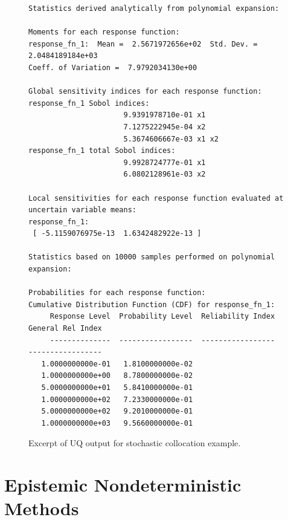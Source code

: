 \begin{figure}
\centering
\begin{bigbox}
\begin{small}
\begin{verbatim}
Statistics derived analytically from polynomial expansion:

Moments for each response function:
response_fn_1:  Mean =  2.5671972656e+02  Std. Dev. = 2.0484189184e+03  
Coeff. of Variation =  7.9792034130e+00

Global sensitivity indices for each response function:
response_fn_1 Sobol indices:
                      9.9391978710e-01 x1
                      7.1275222945e-04 x2
                      5.3674606667e-03 x1 x2
response_fn_1 total Sobol indices:
                      9.9928724777e-01 x1
                      6.0802128961e-03 x2

Local sensitivities for each response function evaluated at 
uncertain variable means:
response_fn_1:
 [ -5.1159076975e-13  1.6342482922e-13 ]

Statistics based on 10000 samples performed on polynomial expansion:

Probabilities for each response function:
Cumulative Distribution Function (CDF) for response_fn_1:
     Response Level  Probability Level  Reliability Index  General Rel Index
     --------------  -----------------  -----------------  -----------------
   1.0000000000e-01   1.8100000000e-02
   1.0000000000e+00   8.7800000000e-02
   5.0000000000e+01   5.8410000000e-01
   1.0000000000e+02   7.2330000000e-01
   5.0000000000e+02   9.2010000000e-01
   1.0000000000e+03   9.5660000000e-01
\end{verbatim}
\end{small}
\end{bigbox}
\caption{Excerpt of UQ output for stochastic collocation example.}
\label{uq:figure12}
\end{figure}

\section{Epistemic Nondeterministic Methods}\label{uq:epistemic}

